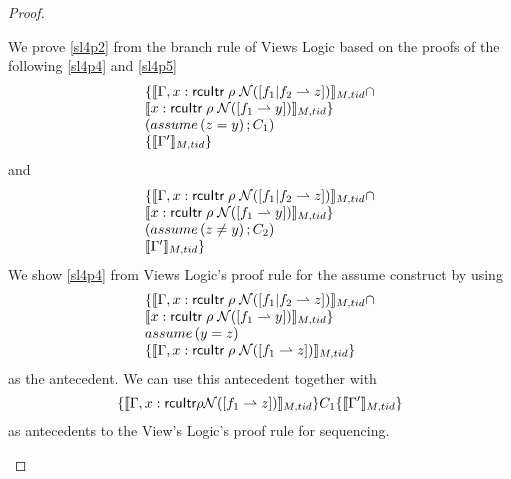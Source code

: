 \begin{proof}
\begin{case}
    We prove \ref{sl4p2} from the branch rule of Views Logic based on the proofs of the following \ref{sl4p4} and \ref{sl4p5}
    \begin{gather}\label{sl4p4}
      \begin{array}{l}
        \{\llbracket \Gamma, x:\textsf{rcuItr}\;\rho\;\mathcal{N}([f_1 | f_2 \rightharpoonup z]) \rrbracket_{M,tid} \cap \\
        \llbracket x:\textsf{rcuItr}\;\rho\;\mathcal{N}([f_1 \rightharpoonup y]) \rrbracket_{M,tid} \}\\
      \left(assume\left(z = y\right);C_1\right)\\
      \{\llbracket \Gamma' \rrbracket_{M,tid}\}
      \end{array}
    \end{gather}
    and
    \begin{gather}\label{sl4p5}
      \begin{array}{l}
        \{\llbracket \Gamma, x:\textsf{rcuItr}\;\rho\;\mathcal{N}([f_1 | f_2 \rightharpoonup z]) \rrbracket_{M,tid} \cap\\
        \llbracket x:\textsf{rcuItr}\;\rho\;\mathcal{N}([f_1 \rightharpoonup y]) \rrbracket_{M,tid} \}\\
        \left(assume\left(z \neq y\right);C_2\right)\\
      \llbracket \Gamma' \rrbracket_{M,tid}\}
      \end{array}
    \end{gather}
    We show \ref{sl4p4} from Views Logic's proof rule for the assume construct by using 
      \[
      \begin{array}{l}
        \{\llbracket \Gamma, x:\textsf{rcuItr}\;\rho\;\mathcal{N}([f_1 | f_2 \rightharpoonup z]) \rrbracket_{M,tid} \cap \\
        \llbracket x:\textsf{rcuItr}\;\rho\;\mathcal{N}([f_1 \rightharpoonup y]) \rrbracket_{M,tid} \} \\
        assume\left(y=z\right)\\
        \{\llbracket \Gamma, x:\textsf{rcuItr}\;\rho\;\mathcal{N}([f_1 \rightharpoonup z]) \rrbracket_{M,tid} \}
      \end{array}
      \]
      as the antecedent. We can use this antecedent together with 
      \[ \{\llbracket \Gamma, x:\textsf{rcuItr}\rho\mathcal{N}([f_1 \rightharpoonup z]) \rrbracket_{M,tid}\} C_1 \{\llbracket\Gamma' \rrbracket_{M,tid}\} \] as antecedents to the View's Logic's proof rule for sequencing.
    

\end{case}
\end{proof}

